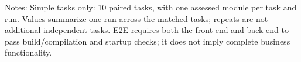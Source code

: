 \par\smallskip
\begin{minipage}{\linewidth}
\footnotesize Notes: Simple tasks only: 10 paired tasks, with one assessed module per task and run. Values summarize one run across the matched tasks; repeats are not additional independent tasks. E2E requires both the front end and back end to pass build/compilation and startup checks; it does not imply complete business functionality.
\end{minipage}
